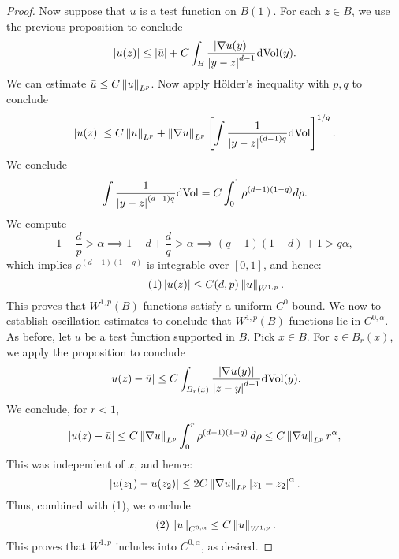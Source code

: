 \documentclass{amsart}
\begin{document}
\begin{proof}
  Now suppose that $u$ is a test function on $B(1)$. For each $z\in B$, we use the previous proposition to conclude
  \begin{equation*}
    \left|u(z)\right|\le \left|\bar{u}\right|+C \int_{B}\frac{\left|\nabla u(y)\right|}{\left|y-z\right|^{d-1}}\mathrm{d}\mathrm{Vol}(y).
  \end{equation*}
  We can estimate $\bar{u}\le C\left\lVert u\right\rVert_{L^{p}}$. Now apply H\"older's inequality with $p,q$ to conclude
  \begin{equation*}
    \left|u(z)\right|\le C\left\lVert u\right\rVert_{L^{p}}+\left\lVert\nabla u\right\rVert_{L^{p}}\left[\int \frac{1}{\left|y-z\right|^{(d-1)q}}\mathrm{d}\mathrm{Vol}\right]^{1/q}.
  \end{equation*}
  We conclude
  \begin{equation*}
    \int \frac{1}{\left|y-z\right|^{(d-1)q}}\mathrm{d}\mathrm{Vol}=C\int_{0}^{1}\rho^{(d-1)(1-q)}d\rho.
  \end{equation*}
  We compute
  \begin{equation*}
    1-\frac{d}{p}>\alpha\implies 1-d+\frac{d}{q}>\alpha\implies (q-1)(1-d)+1>q\alpha,
  \end{equation*}
  which implies $\rho^{(d-1)(1-q)}$ is integrable over $[0,1]$, and hence:
  \begin{equation*}\tag{1}
    \left|u(z)\right|\le C(d,p)\left\lVert u\right\rVert_{W^{1,p}}.
  \end{equation*}
  This proves that $W^{1,p}(B)$ functions satisfy a uniform $C^{0}$ bound. We now to establish oscillation estimates to conclude that $W^{1,p}(B)$ functions lie in $C^{0,\alpha}$. As before, let $u$ be a test function supported in $B$. Pick $x\in B$. For $z\in B_{r}(x)$, we apply the proposition to conclude
  \begin{equation*}
    \left|u(z)-\bar{u}\right|\le C\int_{B_{r}(x)}\frac{\left|\nabla u(y)\right|}{\left|z-y\right|^{d-1}}\mathrm{d}\mathrm{Vol}(y).
  \end{equation*}
  We conclude, for $r<1$,
  \begin{equation*}
    \left|u(z)-\bar{u}\right|\le C\left\lVert\nabla u\right\rVert_{L^{p}}\int_{0}^{r}\rho^{(d-1)(1-q)}\,d\rho\le C\left\lVert\nabla u\right\rVert_{L^{p}}r^{\alpha},
  \end{equation*}
  This was independent of $x$, and hence:
  \begin{equation*}
    \left|u(z_{1})-u(z_{2})\right|\le 2C\left\lVert\nabla u\right\rVert_{L^{p}}\left|z_{1}-z_{2}\right|^{\alpha}.
  \end{equation*}
  Thus, combined with (1), we conclude
  \begin{equation*}\tag{2}
    \left\lVert u\right\rVert_{C^{0,\alpha}}\le C\left\lVert u\right\rVert_{W^{1,p}}.
  \end{equation*}
  This proves that $W^{1,p}$ includes into $C^{0,\alpha}$, as desired.  
\end{proof}
\end{document}
